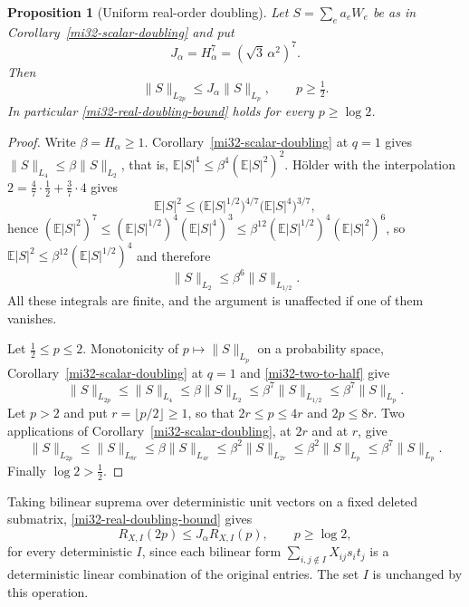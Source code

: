 \documentclass[11pt]{article}
\newtheorem{proposition}[theorem]{Proposition}
\theoremstyle{definition}
\theoremstyle{remark}
\newcommand{\E}{\mathbb E}
\newcommand{\norm}[1]{\lVert#1\rVert}
\begin{document}
\begin{proposition}[Uniform real-order doubling]
\label{mi32-real-doubling}
Let $S=\sum_ea_eW_e$ be as in Corollary~\ref{mi32-scalar-doubling} and
put
\begin{equation}\label{mi32-J-constant}
 J_\alpha=H_\alpha^7=(\sqrt3\,\alpha^2)^7 .
\end{equation}
Then
\begin{equation}\label{mi32-real-doubling-bound}
 \norm{S}_{L_{2p}}\le J_\alpha\norm{S}_{L_p},
 \qquad p\ge\tfrac12 .
\end{equation}
In particular \eqref{mi32-real-doubling-bound} holds for every
$p\ge\log2$.
\end{proposition}
\begin{proof}
Write $\beta=H_\alpha\ge1$. Corollary~\ref{mi32-scalar-doubling} at
$q=1$ gives $\norm{S}_{L_4}\le\beta\norm{S}_{L_2}$, that is,
$\E|S|^4\le\beta^4(\E|S|^2)^2$. H\"older with the interpolation
$2=\tfrac47\cdot\tfrac12+\tfrac37\cdot4$ gives
\[
 \E|S|^2\le\bigl(\E|S|^{1/2}\bigr)^{4/7}
              \bigl(\E|S|^4\bigr)^{3/7},
\]
hence $(\E|S|^2)^7\le(\E|S|^{1/2})^4(\E|S|^4)^3
\le\beta^{12}(\E|S|^{1/2})^4(\E|S|^2)^6$, so
$\E|S|^2\le\beta^{12}(\E|S|^{1/2})^4$ and therefore
\begin{equation}\label{mi32-two-to-half}
 \norm{S}_{L_2}\le\beta^6\norm{S}_{L_{1/2}} .
\end{equation}
All these integrals are finite, and the argument is unaffected if one
of them vanishes.

Let $\tfrac12\le p\le2$. Monotonicity of $p\mapsto\norm{S}_{L_p}$ on a
probability space, Corollary~\ref{mi32-scalar-doubling} at $q=1$ and
\eqref{mi32-two-to-half} give
\[
 \norm{S}_{L_{2p}}\le\norm{S}_{L_4}
   \le\beta\norm{S}_{L_2}
   \le\beta^7\norm{S}_{L_{1/2}}
   \le\beta^7\norm{S}_{L_p} .
\]
Let $p>2$ and put $r=\lfloor p/2\rfloor\ge1$, so that
$2r\le p\le4r$ and $2p\le8r$. Two applications of
Corollary~\ref{mi32-scalar-doubling}, at $2r$ and at $r$, give
\[
 \norm{S}_{L_{2p}}\le\norm{S}_{L_{8r}}
   \le\beta\norm{S}_{L_{4r}}
   \le\beta^2\norm{S}_{L_{2r}}
   \le\beta^2\norm{S}_{L_p}
   \le\beta^7\norm{S}_{L_p} .
\]
Finally $\log2>\tfrac12$.
\end{proof}

Taking bilinear suprema over deterministic unit vectors on a fixed
deleted submatrix, \eqref{mi32-real-doubling-bound} gives
\begin{equation}\label{mi32-weak-doubling}
 R_{X,I}(2p)\le J_\alpha R_{X,I}(p),\qquad p\ge\log2,
\end{equation}
for every deterministic $I$, since each bilinear form
$\sum_{i,j\notin I}X_{ij}s_it_j$ is a deterministic linear combination
of the original entries. The set $I$ is unchanged by this operation.
\end{document}
